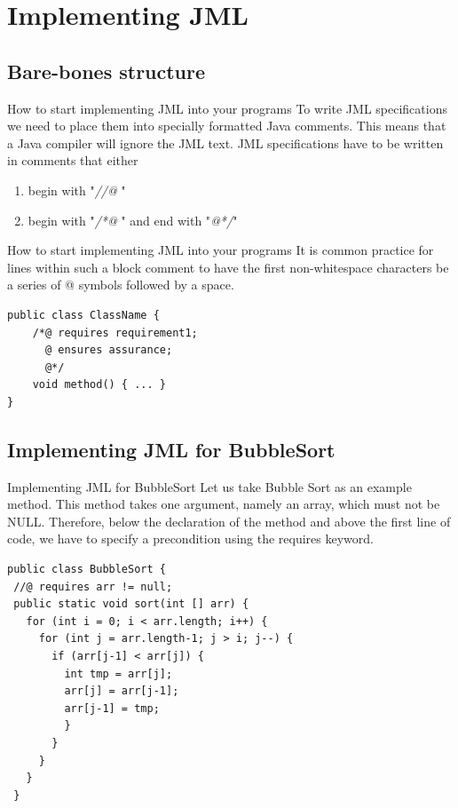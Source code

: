 \documentclass{beamer}
\begin{document}
\section{Implementing JML}
\subsection{Bare-bones structure}
\begin{frame}{How to start implementing JML into your programs}
To write JML specifications we need to place them into specially formatted Java comments. This means that a Java compiler will ignore the JML text. JML specifications have to be written in comments that either
\begin{enumerate}
    \item begin with "\textit{//@ }"
    \item begin with "\textit{/*@ }" and end with "\textit{@*/}"
    
\end{enumerate}
\end{frame}

\begin{frame}[fragile]{How to start implementing JML into your programs}
It is common practice for lines within such a block comment to have the first non-whitespace characters be a series of @ symbols followed by a space. 
\begin{lstlisting}
public class ClassName {
    /*@ requires requirement1;
      @ ensures assurance;
      @*/
    void method() { ... }
}
\end{lstlisting}
\end{frame}

\subsection{Implementing JML for BubbleSort}
\begin{frame}{Implementing JML for BubbleSort}
Let us take Bubble Sort as an example method. This method takes one argument, namely an array, which must not be NULL. Therefore, below the declaration of the method and above the first line of code, we have to specify a precondition using the requires keyword.    
\end{frame}

\begin{frame}[fragile]{}
\begin{lstlisting}
public class BubbleSort {    
 //@ requires arr != null;
 public static void sort(int [] arr) {        
   for (int i = 0; i < arr.length; i++) {
     for (int j = arr.length-1; j > i; j--) {
       if (arr[j-1] < arr[j]) {
         int tmp = arr[j];
         arr[j] = arr[j-1];
         arr[j-1] = tmp;
         }
       }
     }
   }
 }
\end{lstlisting}
\end{frame}
\end{document}
